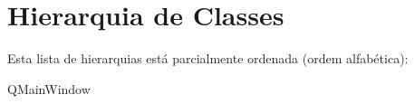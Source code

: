 \section{Hierarquia de Classes}
Esta lista de hierarquias está parcialmente ordenada (ordem alfabética)\+:\begin{DoxyCompactList}
\item Q\+Main\+Window\begin{DoxyCompactList}
\item {}
\end{DoxyCompactList}
\end{DoxyCompactList}
